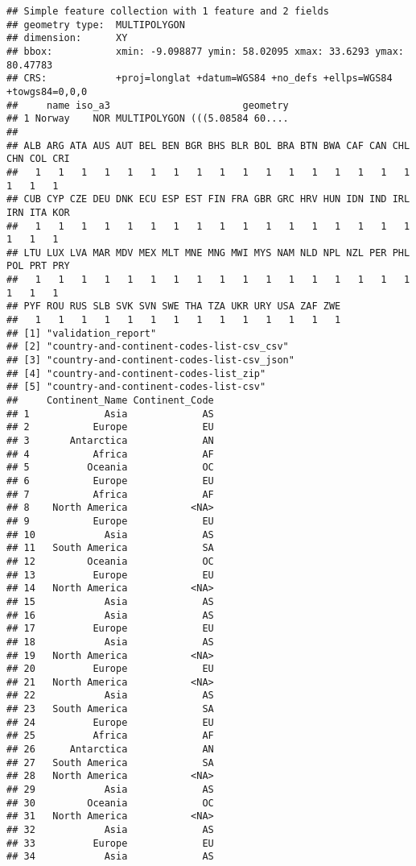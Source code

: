 \documentclass[
]{article}
\begin{document}
\begin{verbatim}
## Simple feature collection with 1 feature and 2 fields
## geometry type:  MULTIPOLYGON
## dimension:      XY
## bbox:           xmin: -9.098877 ymin: 58.02095 xmax: 33.6293 ymax: 80.47783
## CRS:            +proj=longlat +datum=WGS84 +no_defs +ellps=WGS84 +towgs84=0,0,0
##     name iso_a3                       geometry
## 1 Norway    NOR MULTIPOLYGON (((5.08584 60....
## 
## ALB ARG ATA AUS AUT BEL BEN BGR BHS BLR BOL BRA BTN BWA CAF CAN CHL CHN COL CRI 
##   1   1   1   1   1   1   1   1   1   1   1   1   1   1   1   1   1   1   1   1 
## CUB CYP CZE DEU DNK ECU ESP EST FIN FRA GBR GRC HRV HUN IDN IND IRL IRN ITA KOR 
##   1   1   1   1   1   1   1   1   1   1   1   1   1   1   1   1   1   1   1   1 
## LTU LUX LVA MAR MDV MEX MLT MNE MNG MWI MYS NAM NLD NPL NZL PER PHL POL PRT PRY 
##   1   1   1   1   1   1   1   1   1   1   1   1   1   1   1   1   1   1   1   1 
## PYF ROU RUS SLB SVK SVN SWE THA TZA UKR URY USA ZAF ZWE 
##   1   1   1   1   1   1   1   1   1   1   1   1   1   1 
## [1] "validation_report"                        
## [2] "country-and-continent-codes-list-csv_csv" 
## [3] "country-and-continent-codes-list-csv_json"
## [4] "country-and-continent-codes-list_zip"     
## [5] "country-and-continent-codes-list-csv"     
##     Continent_Name Continent_Code
## 1             Asia             AS
## 2           Europe             EU
## 3       Antarctica             AN
## 4           Africa             AF
## 5          Oceania             OC
## 6           Europe             EU
## 7           Africa             AF
## 8    North America           <NA>
## 9           Europe             EU
## 10            Asia             AS
## 11   South America             SA
## 12         Oceania             OC
## 13          Europe             EU
## 14   North America           <NA>
## 15            Asia             AS
## 16            Asia             AS
## 17          Europe             EU
## 18            Asia             AS
## 19   North America           <NA>
## 20          Europe             EU
## 21   North America           <NA>
## 22            Asia             AS
## 23   South America             SA
## 24          Europe             EU
## 25          Africa             AF
## 26      Antarctica             AN
## 27   South America             SA
## 28   North America           <NA>
## 29            Asia             AS
## 30         Oceania             OC
## 31   North America           <NA>
## 32            Asia             AS
## 33          Europe             EU
## 34            Asia             AS

\end{verbatim}
\end{document}
